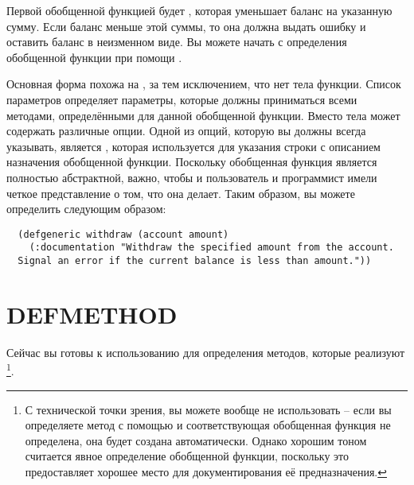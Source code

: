 
Первой обобщенной функцией будет , которая уменьшает баланс на указанную
сумму.  Если баланс меньше этой суммы, то она должна выдать ошибку и оставить баланс в
неизменном виде.  Вы можете начать с определения обобщенной функции при помощи
.

Основная форма  похожа на , за тем исключением, что нет тела
функции.  Список параметров  определяет параметры, которые должны
приниматься всеми методами, определёнными для данной обобщенной функции.  Вместо тела
 может содержать различные опции.  Одной из опций, которую вы должны
всегда указывать, является , которая используется для указания строки
с описанием назначения обобщенной функции.  Поскольку обобщенная функция является
полностью абстрактной, важно, чтобы и пользователь и программист имели четкое
представление о том, что она делает.  Таким образом, вы можете определить 
следующим образом:

\begin{lstlisting}
  (defgeneric withdraw (account amount)
    (:documentation "Withdraw the specified amount from the account.
  Signal an error if the current balance is less than amount."))
\end{lstlisting}

\section{DEFMETHOD}

Сейчас вы готовы к использованию  для определения методов, которые
реализуют \footnote{С технической точки зрения, вы можете вообще не
  использовать  -- если вы определяете метод с помощью  и
  соответствующая обобщенная функция не определена, она будет создана автоматически.
  Однако хорошим тоном считается явное определение обобщенной функции, поскольку это
  предоставляет хорошее место для документирования её предназначения.}.

